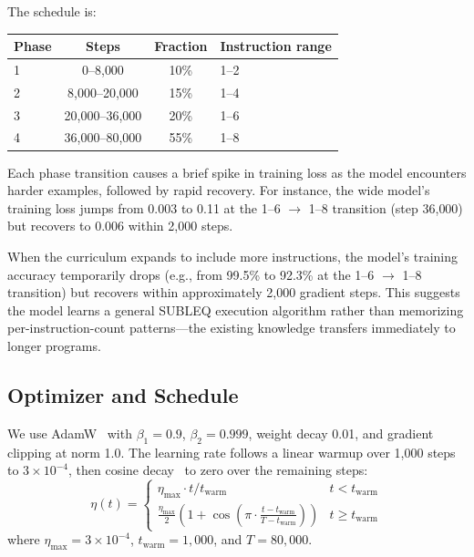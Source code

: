 \documentclass[11pt,a4paper]{article}
\begin{document}
The schedule is:
\begin{center}
\begin{tabular}{lccl}
\toprule
\textbf{Phase} & \textbf{Steps} & \textbf{Fraction} & \textbf{Instruction range} \\
\midrule
1 & 0--8{,}000 & 10\% & 1--2 \\
2 & 8{,}000--20{,}000 & 15\% & 1--4 \\
3 & 20{,}000--36{,}000 & 20\% & 1--6 \\
4 & 36{,}000--80{,}000 & 55\% & 1--8 \\
\bottomrule
\end{tabular}
\end{center}

Each phase transition causes a brief spike in training loss as the model encounters harder examples, followed by rapid recovery.
For instance, the wide model's training loss jumps from 0.003 to 0.11 at the 1--6 $\to$ 1--8 transition (step 36{,}000) but recovers to 0.006 within 2{,}000 steps.

\begin{observation}
When the curriculum expands to include more instructions, the model's training accuracy temporarily drops (e.g., from 99.5\% to 92.3\% at the 1--6 $\to$ 1--8 transition) but recovers within approximately 2{,}000 gradient steps.
This suggests the model learns a general SUBLEQ execution algorithm rather than memorizing per-instruction-count patterns---the existing knowledge transfers immediately to longer programs.
\end{observation}

\subsection{Optimizer and Schedule}

We use AdamW~\cite{loshchilov2019adamw} with $\beta_1 = 0.9$, $\beta_2 = 0.999$, weight decay 0.01, and gradient clipping at norm 1.0.
The learning rate follows a linear warmup over 1{,}000 steps to $3 \times 10^{-4}$, then cosine decay~\cite{loshchilov2017sgdr} to zero over the remaining steps:
\begin{equation}
  \eta(t) =
  \begin{cases}
    \eta_{\max} \cdot t / t_{\text{warm}} & t < t_{\text{warm}} \\
    \frac{\eta_{\max}}{2}\left(1 + \cos\!\left(\pi \cdot \frac{t - t_{\text{warm}}}{T - t_{\text{warm}}}\right)\right) & t \geq t_{\text{warm}}
  \end{cases}
\end{equation}
where $\eta_{\max} = 3 \times 10^{-4}$, $t_{\text{warm}} = 1{,}000$, and $T = 80{,}000$.
\end{document}

